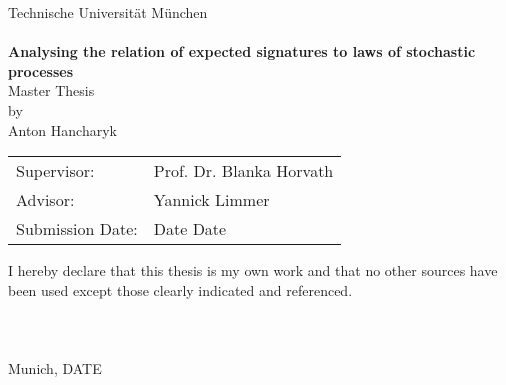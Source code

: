 \documentclass[12pt,a4paper]{report}
\theoremstyle{definition}
\begin{document}
\begin{titlepage}
\voffset-40mm
  \parbox{1.5cm}{}\hspace{310pt}
  \parbox{1.5cm}{}
\vspace*{1.5cm}
\begin{center}
{\Huge Technische Universit\"at M\"unchen} 
\\
\vspace*{1cm}
{\huge {}} 
\\
\vspace*{4cm}
{\Huge {\bf Analysing the relation of expected signatures to laws of stochastic processes}}\\
\vspace*{2cm}
{\Large Master Thesis}\linebreak \\ 
{\Large by}\linebreak \\
{\Large Anton Hancharyk}\\
\vspace*{2cm}
{\Large 
\begin{tabular}{ll}
Supervisor: & Prof. Dr. Blanka Horvath\\
Advisor: & Yannick Limmer \\
Submission Date: & Date Date 
\end{tabular}
}
\end{center}
\end{titlepage}


\thispagestyle{plain}
\vspace*{18cm}
\noindent
I hereby declare that this thesis is my own work and that no other sources have been used except those clearly indicated and referenced.\\\\\\\\

Munich, DATE
\newpage 

\begin{abstract}
About 200 words and summarizing the thesis. 
\end{abstract}
\end{document}
